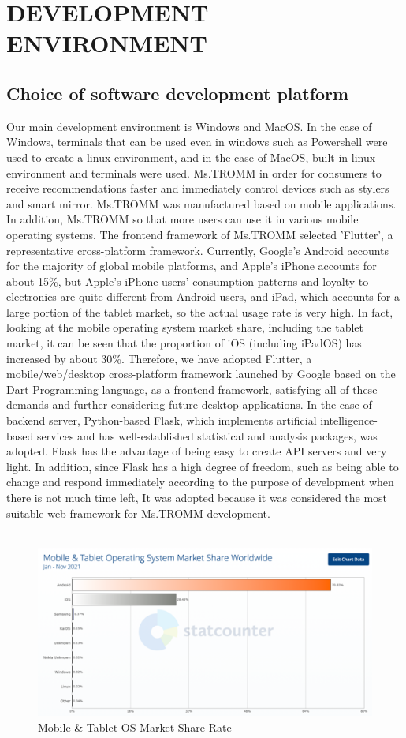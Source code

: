 \documentclass[conference]{IEEEtran}
\begin{document}
\section{DEVELOPMENT ENVIRONMENT }
\subsection{Choice of software development platform}
Our main development environment is Windows and MacOS. In the case of Windows, terminals that can be used even in windows such as Powershell were used to create a linux environment, and in the case of MacOS, built-in linux environment and terminals were used. Ms.TROMM in order for consumers to receive recommendations faster and immediately control devices such as stylers and smart mirror. Ms.TROMM was manufactured based on mobile applications. In addition, Ms.TROMM so that more users can use it in various mobile operating systems. The frontend framework of Ms.TROMM selected 'Flutter', a representative cross-platform framework. Currently, Google's Android accounts for the majority of global mobile platforms, and Apple's iPhone accounts for about 15\%, but Apple's iPhone users' consumption patterns and loyalty to electronics are quite different from Android users, and iPad, which accounts for a large portion of the tablet market, so the actual usage rate is very high. In fact, looking at the mobile operating system market share, including the tablet market, it can be seen that the proportion of iOS (including iPadOS) has increased by about 30\%. Therefore, we have adopted Flutter, a mobile/web/desktop cross-platform framework launched by Google based on the Dart Programming language, as a frontend framework, satisfying all of these demands and further considering future desktop applications. In the case of backend server, Python-based Flask, which implements artificial intelligence-based services and has well-established statistical and analysis packages, was adopted. Flask has the advantage of being easy to create API servers and very light. In addition, since Flask has a high degree of freedom, such as being able to change and respond immediately according to the purpose of development when there is not much time left, It was adopted because it was considered the most suitable web framework for Ms.TROMM development.\\ \\ 

\begin{figure}[]
\centerline{\includegraphics{assets/그림1.png}}
\caption{Mobile \& Tablet OS Market Share Rate}
\label{fig}
\end{figure}
\end{document}

